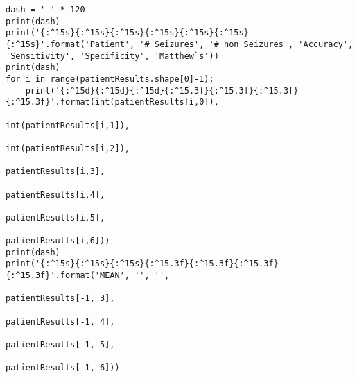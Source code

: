 \documentclass[11pt]{article}
\begin{document}
\begin{verbatim}
dash = '-' * 120
print(dash)
print('{:^15s}{:^15s}{:^15s}{:^15s}{:^15s}{:^15s}{:^15s}'.format('Patient', '# Seizures', '# non Seizures', 'Accuracy', 'Sensitivity', 'Specificity', 'Matthew`s'))
print(dash)
for i in range(patientResults.shape[0]-1):
    print('{:^15d}{:^15d}{:^15d}{:^15.3f}{:^15.3f}{:^15.3f}{:^15.3f}'.format(int(patientResults[i,0]), 
                                                                             int(patientResults[i,1]), 
                                                                             int(patientResults[i,2]), 
                                                                             patientResults[i,3], 
                                                                             patientResults[i,4], 
                                                                             patientResults[i,5],
                                                                             patientResults[i,6]))
print(dash)
print('{:^15s}{:^15s}{:^15s}{:^15.3f}{:^15.3f}{:^15.3f}{:^15.3f}'.format('MEAN', '', '', 
                                                                         patientResults[-1, 3], 
                                                                         patientResults[-1, 4], 
                                                                         patientResults[-1, 5],
                                                                         patientResults[-1, 6]))
\end{verbatim}
\end{document}
